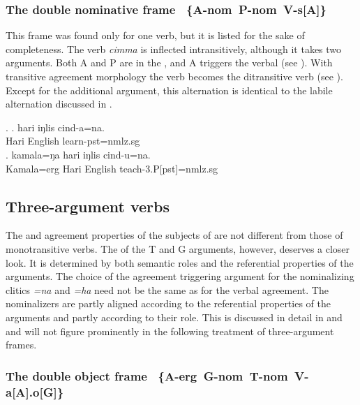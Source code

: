 \subsubsection[The double nominative frame]{The double nominative frame%
\mbox{ \{A-{\sc nom} P-{\sc nom} V-s[A]\}}\label{itr-teach}}


\noindent
This frame was found only for one verb, but it is listed for the sake of completeness. The verb \emph{cimma}  is inflected intransitively, although it takes two arguments. Both A and P are in the , and  A triggers the verbal  (see  \Next[a]). With transitive agreement morphology the verb becomes the ditransitive verb  (see \Next[b]). Except for the additional argument, this alternation is identical to the labile alternation discussed in . 

\ex. \ag. hari iŋlis cind-a=na.\\
		Hari English learn{\sc [3sg]-pst=nmlz.sg}	\\
 	\bg. kamala=ŋa hari iŋlis cind-u=na.\\
	Kamala{\sc =erg} Hari English teach{\sc -3.P[pst]=nmlz.sg}		\\

\subsection[]{Three-argument verbs}\label{three-arg-frame}

The  and agreement properties of the subjects of  are not different from those of monotransitive verbs. The  of the T and G arguments, however, deserves a closer look. It is determined  by both semantic roles and the referential properties of the arguments.  The choice of the agreement triggering argument for the nominalizing clitics \emph{=na} and \emph{=ha} need not be the same as for the verbal agreement. The nominalizers are partly aligned according to the referential properties of the arguments and partly according to their role. This is discussed in detail in  and  and will not figure prominently in the following treatment of three-argument frames.
 
\subsubsection[The double object frame]{The double object frame %
\mbox{ \{A-{\sc erg} G-{\sc nom} T-{\sc nom}  V-a[A].o[G]\}}}

